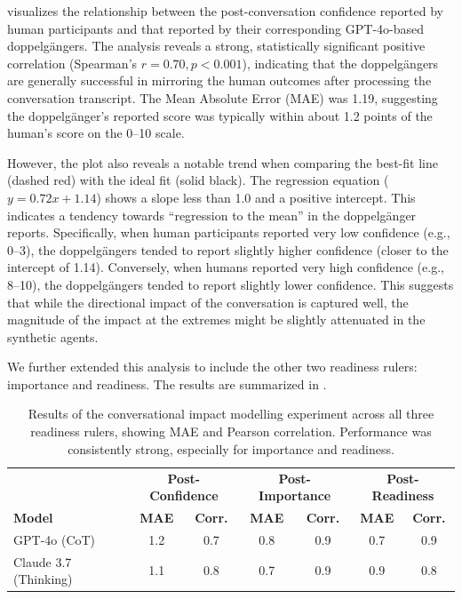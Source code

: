  visualizes the relationship between the post-conversation confidence reported by human participants and that reported by their corresponding GPT-4o-based doppelgängers. The analysis reveals a strong, statistically significant positive correlation (Spearman's $r=0.70, p < 0.001$), indicating that the doppelgängers are generally successful in mirroring the human outcomes after processing the conversation transcript. The Mean Absolute Error (MAE) was 1.19, suggesting the doppelgänger's reported score was typically within about 1.2 points of the human's score on the 0--10 scale.

However, the plot also reveals a notable trend when comparing the best-fit line (dashed
red) with the ideal fit (solid black). The regression equation ($y=0.72x+1.14$) shows a
slope less than 1.0 and a positive intercept. This indicates a tendency towards
``regression to the mean'' in the doppelgänger reports. Specifically, when human
participants reported very low confidence (e.g., 0--3), the doppelgängers tended to
report slightly higher confidence (closer to the intercept of 1.14). Conversely, when
humans reported very high confidence (e.g., 8--10), the doppelgängers tended to report
slightly lower confidence. This suggests that while the directional impact of the
conversation is captured well, the magnitude of the impact at the extremes might be
slightly attenuated in the synthetic agents.

We further extended this analysis to include the other two readiness rulers: importance
and readiness. The results are summarized in .

\begin{table}[!ht]
	\centering
	\begin{tabular}{l|cc|cc|cc}
		\toprule
		                      & \multicolumn{2}{c|}{\textbf{Post-Confidence}} & \multicolumn{2}{c|}{\textbf{Post-Importance}} & \multicolumn{2}{c}{\textbf{Post-Readiness}}                                                  \\
		\textbf{Model}        & \textbf{MAE}                                  & \textbf{Corr.}                                & \textbf{MAE}                                & \textbf{Corr.} & \textbf{MAE} & \textbf{Corr.} \\
		\midrule
		GPT-4o (CoT)          & 1.2                                           & 0.7                                           & 0.8                                         & 0.9            & 0.7          & 0.9            \\
		Claude 3.7 (Thinking) & 1.1                                           & 0.8                                           & 0.7                                         & 0.9            & 0.9          & 0.8            \\ \hline
	\end{tabular}
	\caption[Multi-ruler conversational impact modelling results]{Results of the conversational impact modelling experiment across all three readiness rulers, showing MAE and Pearson correlation. Performance was consistently strong, especially for importance and readiness.}
	\label{tab:autoplay_results_full}
\end{table}

